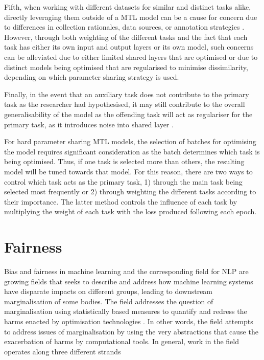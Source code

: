 Fifth, when working with different datasets for similar and distinct tasks alike, directly leveraging them outside of a MTL model can be a cause for concern due to differences in collection rationales, data sources, or annotation strategies \cite{Waseem:2018}. 
However, through both weighting of the different tasks and the fact that each task has either its own input and output layers or its own model, such concerns can be alleviated due to either limited shared layers that are optimised or due to distinct models being optimised that are regularised to minimise dissimilarity, depending on which parameter sharing strategy is used.

Finally, in the event that an auxiliary task does not contribute to the primary task as the researcher had hypothesised, it may still contribute to the overall generalisability of the model as the offending task will act as regulariser for the primary task, as it introduces noise into shared layer \citep{Bingel:2018}.

For hard parameter sharing MTL models, the selection of batches for optimising the model requires significant consideration as the batch determines which task is being optimised. 
Thus, if one task is selected more than others, the resulting model will be tuned towards that model.
For this reason, there are two ways to control which task acts as the primary task, 1) through the main task being selected most frequently or 2) through weighting the different tasks according to their importance.
The latter method controls the influence of each task by multiplying the weight of each task with the loss produced following each epoch.

\section{Fairness}\label{sec:fairlitt}

Bias and fairness in machine learning and the corresponding field for NLP are growing fields that seeks to describe and address how machine learning systems have disparate impacts on different groups, leading to downstream marginalisation of some bodies.
The field addresses the question of marginalisation using statistically based measures to quantify and redress the harms enacted by optimisation technologies \citep{Kulynych:2020}.
In other words, the field attempts to address issues of marginalisation by using the very abstractions that cause the exacerbation of harms by computational tools.
In general, work in the field operates along three different strands

